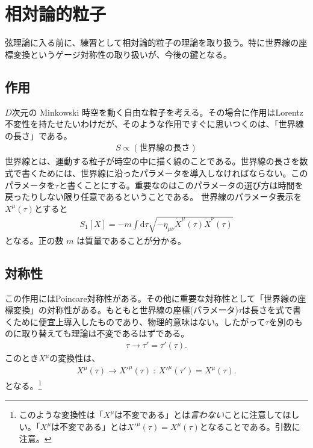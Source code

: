 \documentclass[report,paper=a4, fontsize=12pt, line_length=16cm, number_of_lines=33,dvipdfmx]{jlreq}
\numberwithin{equation}{chapter}
\numberwithin{equation}{section}
\newcommand{\di}{\mathrm{d}}
\begin{document}
\section{相対論的粒子}
弦理論に入る前に、練習として相対論的粒子の理論を取り扱う。特に世界線の座標変換というゲージ対称性の取り扱いが、今後の鍵となる。
\subsection{作用}
$D$次元の Minkowski 時空を動く自由な粒子を考える。その場合に作用はLorentz不変性を持たせたいわけだが、そのような作用ですぐに思いつくのは、「世界線の長さ」である。
\begin{align}
 S \propto (\text{世界線の長さ})
\end{align}
世界線とは、運動する粒子が時空の中に描く線のことである。世界線の長さを数式で書くためには、世界線に沿ったパラメータを導入しなければならない。このパラメータを$\tau$と書くことにする。重要なのはこのパラメータの選び方は時間を戻ったりしない限り任意であるということである。  世界線のパラメータ表示を$X^{\mu}(\tau)$とすると
\begin{align}
 S_{1}[X]=-m\int \di \tau \sqrt{-\eta_{\mu\nu}\dot{X}^{\mu}(\tau) \dot{X}^{\nu}(\tau)}
\label{particle-action1}
\end{align}
となる。正の数 $m$ は質量であることが分かる。
\subsection{対称性}
この作用にはPoincare対称性がある。その他に重要な対称性として「世界線の座標変換」の対称性がある。もともと世界線の座標(パラメータ)$\tau$は長さを式で書くために便宜上導入したものであり、物理的意味はない。したがって$\tau$を別のものに取り替えても理論は不変であるはずである。
\begin{align}
 \tau\to \tau'=\tau'(\tau).
\end{align}
このとき$X^{\mu}$の変換性は、
\begin{align}
 X^{\mu}(\tau)\to X'^{\mu}(\tau)\ :\ X'^{\mu}(\tau')=X^{\mu}(\tau).
\label{particle-reparam1}
\end{align}
となる。\footnote{このような変換性は「$X^{\mu}$は不変である」とは{\em 言わない}ことに注意してほしい。「$X^{\mu}$は不変である」とは$X'^{\mu}(\tau)=X^{\mu}(\tau)$となることである。引数に注意。}
\end{document}
